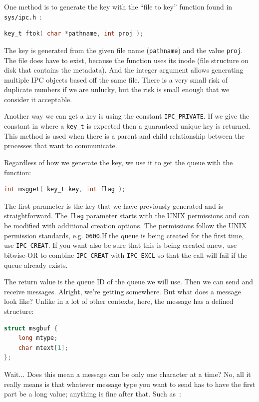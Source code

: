 One method is to generate the key with the ``file to key'' function found in \texttt{sys/ipc.h}~\cite{lpi}:
\begin{lstlisting}[language=C]
key_t ftok( char *pathname, int proj );
\end{lstlisting}
 
The key is generated from the given file name (\texttt{pathname}) and the value \texttt{proj}. The file does have to exist, because the function uses its inode (file structure on disk that contains the metadata). And the integer argument allows generating multiple IPC objects based off the same file. There is a very small risk of duplicate numbers if we are unlucky, but the risk is small enough that we consider it acceptable.

Another way we can get a key is using the constant \texttt{IPC\_PRIVATE}. If we give the constant in where a \texttt{key\_t} is expected then a guaranteed unique key is returned. This method is used when there is a parent and child relationship between the processes that want to communicate.

Regardless of how we generate the key, we use it to get the queue with the function:
\begin{lstlisting}[language=C]
int msgget( key_t key, int flag );
\end{lstlisting}
 
The first parameter is the key that we have previously generated and is straightforward. The \texttt{flag} parameter starts with the UNIX permissions and can be modified with additional creation options. The  permissions follow the UNIX permission standards, e.g. \texttt{0600}.If the queue is being created for the first time, use \texttt{IPC\_CREAT}. If you want also be sure that this is being created anew, use bitwise-OR to combine \texttt{IPC\_CREAT} with \texttt{IPC\_EXCL} so that the call will fail if the queue already exists.

The return value is the queue ID of the queue we will use. Then we can send and receive messages. Alright, we're getting somewhere. But what does a message look like? Unlike in a lot of other contexts, here, the message has a defined structure: 

\begin{lstlisting}[language=C]
struct msgbuf {
    long mtype;
    char mtext[1];
};
\end{lstlisting}

Wait... Does this mean a message can be only one character at a time? No, all it really means is that whatever message type you want to send has to have the first part be a long value; anything is fine after that. Such as~\cite{bmq}:

